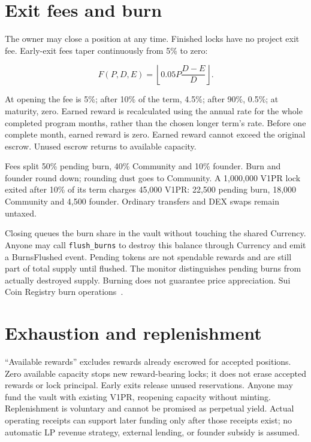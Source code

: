 \documentclass[11pt]{article}
\begin{document}
\section{Exit fees and burn}

The owner may close a position at any time. Finished locks have no project exit fee. Early-exit fees taper continuously from 5\% to zero:

\begin{equation}
F(P,D,E)=\left\lfloor 0.05P\frac{D-E}{D}\right\rfloor.
\end{equation}

At opening the fee is 5\%; after 10\% of the term, 4.5\%; after 90\%, 0.5\%; at maturity, zero. Earned reward is recalculated using the annual rate for the whole completed program months, rather than the chosen longer term's rate. Before one complete month, earned reward is zero. Earned reward cannot exceed the original escrow. Unused escrow returns to available capacity.

Fees split 50\% pending burn, 40\% Community and 10\% founder. Burn and founder round down; rounding dust goes to Community. A 1,000,000 V1PR lock exited after 10\% of its term charges 45,000 V1PR: 22,500 pending burn, 18,000 Community and 4,500 founder. Ordinary transfers and DEX swaps remain untaxed.

Closing queues the burn share in the vault without touching the shared Currency. Anyone may call \texttt{flush\_burns} to destroy this balance through Currency and emit a BurnsFlushed event. Pending tokens are not spendable rewards and are still part of total supply until flushed. The monitor distinguishes pending burns from actually destroyed supply. Burning does not guarantee price appreciation. Sui Coin Registry burn operations~\cite{ref4}.

\section{Exhaustion and replenishment}

``Available rewards'' excludes rewards already escrowed for accepted positions. Zero available capacity stops new reward-bearing locks; it does not erase accepted rewards or lock principal. Early exits release unused reservations. Anyone may fund the vault with existing V1PR, reopening capacity without minting. Replenishment is voluntary and cannot be promised as perpetual yield. Actual operating receipts can support later funding only after those receipts exist; no automatic LP revenue strategy, external lending, or founder subsidy is assumed.
\end{document}
